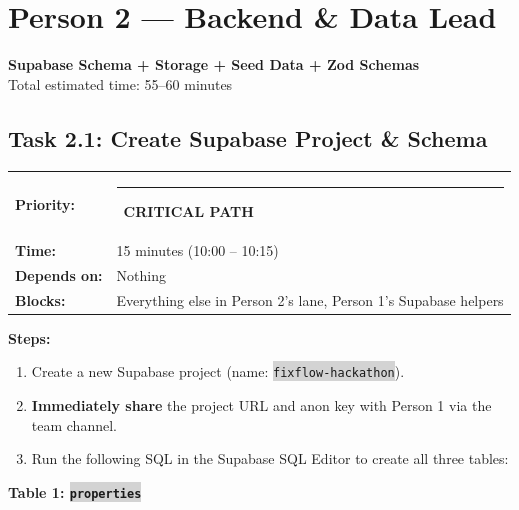 \documentclass[11pt, a4paper]{article}
\newcommand{\critical}{\textcolor{critred}{\rule{6pt}{6pt}}~\textcolor{critred}{\scriptsize\textbf{CRITICAL PATH}}}
\newcommand{\code}[1]{\texttt{\small\colorbox{lightgray}{#1}}}
\begin{document}
\newpage

\section{Person 2 --- Backend \& Data Lead}
\begin{center}
\textcolor{medteal}{\large\textbf{Supabase Schema + Storage + Seed Data + Zod Schemas}}\\[2pt]
\textcolor{textmuted}{\small Total estimated time: 55--60 minutes}
\end{center}

\vspace{0.5em}

\subsection{Task 2.1: Create Supabase Project \& Schema}

\begin{tabularx}{\textwidth}{lX}
\textbf{Priority:} & \critical \\
\textbf{Time:} & 15 minutes (10:00 -- 10:15) \\
\textbf{Depends on:} & Nothing \\
\textbf{Blocks:} & Everything else in Person 2's lane, Person 1's Supabase helpers \\
\end{tabularx}

\vspace{0.3em}

\textbf{Steps:}
\begin{enumerate}[leftmargin=2em, itemsep=2pt]
  \item Create a new Supabase project (name: \code{fixflow-hackathon}).
  \item \textbf{Immediately share} the project URL and anon key with Person 1 via the team channel.
  \item Run the following SQL in the Supabase SQL Editor to create all three tables:
\end{enumerate}

\textbf{Table 1: \code{properties}}
\end{document}
